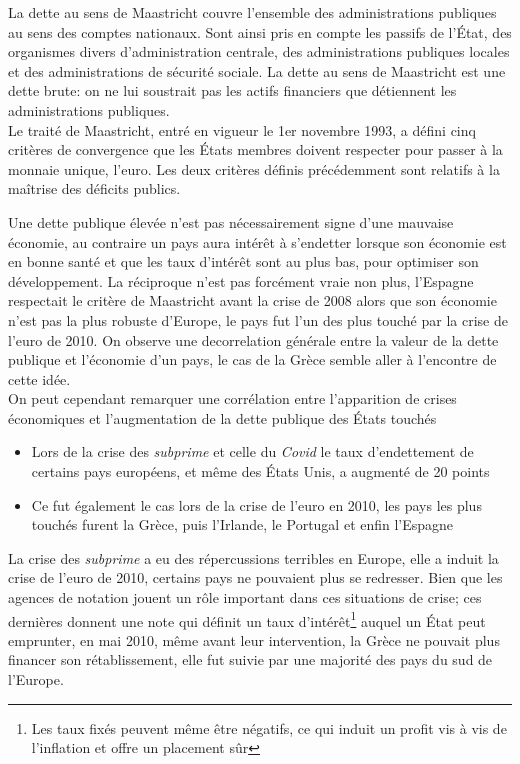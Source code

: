 \documentclass[main.tex]{subfiles}
\begin{document}
\begin{definition}
       La dette au sens de Maastricht couvre l'ensemble des administrations publiques au sens des comptes nationaux. Sont ainsi pris en compte les passifs de l'État, des organismes divers d'administration centrale, des administrations publiques locales et des administrations de sécurité sociale. La dette au sens de Maastricht est une dette brute: on ne lui soustrait pas les actifs financiers que détiennent les administrations publiques. \\
       Le traité de Maastricht, entré en vigueur le 1er novembre 1993, a défini cinq critères de convergence que les États membres doivent respecter pour passer à la monnaie unique, l'euro. Les deux critères définis précédemment sont relatifs à la maîtrise des déficits publics.
\end{definition}


Une dette publique élevée n'est pas nécessairement signe d'une mauvaise économie, au contraire un pays aura intérêt à s'endetter lorsque son économie est en bonne santé et que les taux d'intérêt sont au plus bas, pour optimiser son développement. La réciproque n'est pas forcément vraie non plus, l'Espagne respectait le critère de Maastricht avant la crise de 2008 alors que son économie n'est pas la plus robuste d'Europe, le pays fut l'un des plus touché par la crise de l'euro de 2010. On observe une decorrelation générale entre la valeur de la dette publique et l'économie d'un pays, le cas de la Grèce semble aller à l'encontre de cette idée. \\

On peut cependant remarquer une corrélation entre l'apparition de crises économiques et l'augmentation de la dette publique des États touchés
\begin{itemize}
        \item Lors de la crise des \emph{subprime} et celle du \emph{Covid} le taux d'endettement de certains pays européens, et même des États Unis, a augmenté de 20 points
        \item Ce fut également le cas lors de la crise de l'euro en 2010, les pays les plus touchés furent la Grèce, puis l'Irlande, le Portugal et enfin l'Espagne
\end{itemize}
La crise des \emph{subprime} a eu des répercussions terribles en Europe, elle a induit la crise de l'euro de 2010, certains pays ne pouvaient plus se redresser.
Bien que les agences de notation jouent un rôle important dans ces situations de crise; ces dernières donnent une note qui définit un taux d'intérêt\footnote{Les taux fixés peuvent même être négatifs, ce qui induit un profit vis à vis de l'inflation et offre un placement sûr} auquel un État peut emprunter, en mai 2010, même avant leur intervention, la Grèce ne pouvait plus financer son rétablissement, elle fut suivie par une majorité des pays du sud de l'Europe. \\ 
\end{document}
